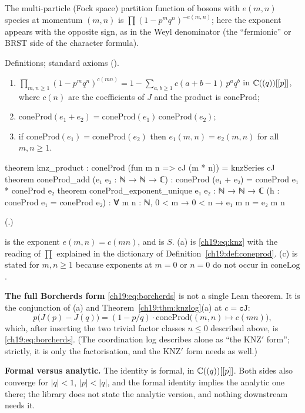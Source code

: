 \begin{physics}
The multi-particle (Fock space) partition function of bosons with $e(m,n)$ species at momentum $(m,n)$ is
$\prod(1-p^mq^n)^{-e(m,n)}$; here the exponent appears with the opposite sign, as in the Weyl denominator (the ``fermionic''
or BRST side of the character formula).
\end{physics}
\begin{status}Definitions; standard axioms ().\end{status}

\begin{theorem}\label{ch19:thm:knzproduct}
\begin{enumerate}[label=(\alph*)]
\item $\prod_{m,n\ge1}(1-p^mq^n)^{c(mn)}=1-\sum_{a,b\ge1}c(a+b-1)\,p^aq^b$ in ${\mathbb{C}}((q))[[p]]$, where $c(n)$ are the
  coefficients of $J$ and the product is $\mathrm{coneProd}$;
\item $\mathrm{coneProd}(e_1+e_2)=\mathrm{coneProd}(e_1)\,\mathrm{coneProd}(e_2)$;
\item if $\mathrm{coneProd}(e_1)=\mathrm{coneProd}(e_2)$ then $e_1(m,n)=e_2(m,n)$ for all $m,n\ge1$.
\end{enumerate}
\end{theorem}
\begin{leancode}
theorem knz_product : coneProd (fun m n => cJ (m * n)) = knzSeries cJ
theorem coneProd_add (e₁ e₂ : ℕ → ℕ → ℂ) : coneProd (e₁ + e₂) = coneProd e₁ * coneProd e₂
theorem coneProd_exponent_unique {e₁ e₂ : ℕ → ℕ → ℂ} (h : coneProd e₁ = coneProd e₂) :
    ∀ m n : ℕ, 0 < m → 0 < n → e₁ m n = e₂ m n
\end{leancode}
(.)
\begin{dictionary}
 is the exponent $e(m,n)=c(mn)$, and  is $S$.  (a) is \eqref{ch19:eq:knz}
with the reading of $\prod$ explained in the dictionary of Definition~\ref{ch19:def:coneprod}.  (c) is stated for
$m,n\ge1$ because exponents at $m=0$ or $n=0$ do not occur in $\mathrm{coneLog}$.

\textbf{The full Borcherds form} \eqref{ch19:eq:borcherds} is not a single Lean theorem.  It is the conjunction of (a)
and Theorem~\ref{ch19:thm:knzlog}(a) at $c=\mathtt{cJ}$:
\begin{equation*}
  p\bigl(J(p)-J(q)\bigr)=(1-p/q)\cdot\mathrm{coneProd}\bigl((m,n)\mapsto c(mn)\bigr),
\end{equation*}
which, after inserting the two trivial factor classes $n\le0$ described above, is \eqref{ch19:eq:borcherds}.  (The
coordination log describes  alone as ``the KNZ$'$ form''; strictly, it is only the factorisation,
and the KNZ$'$ form needs  as well.)

\textbf{Formal versus analytic.}  The identity is formal, in ${\mathbb{C}}((q))[[p]]$.  Both sides also converge for $|q|<1$,
$|p|<|q|$, and the formal identity implies the analytic one there; the library does not state the analytic version,
and nothing downstream needs it.
\end{dictionary}
